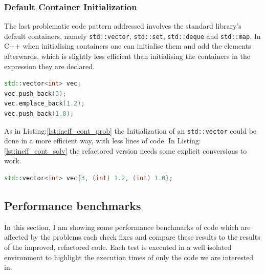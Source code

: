 \subsubsection{Default Container Initialization}
\par The last problematic code pattern addressed involves the standard library's default containers, namely \verb|std::vector|, \verb|std::set|, \verb|std::deque| and \verb|std::map|. In C++ when initialising containers one can initialise them and add the elements afterwards, which is slightly less efficient than initialising the containers in the expression they are declared. \medskip
\begin{lstlisting}[language=c++, frame=single ,caption={Inefficient way of creating containers}, label={lst:ineff_cont_prob}]
std::vector<int> vec;
vec.push_back(3);
vec.emplace_back(1.2);
vec.push_back(1.0);
\end{lstlisting}
\par As in Listing:\ref{lst:ineff_cont_prob} the Initialization of an \verb|std::vector| could be done in a more efficient way, with less lines of code. In Listing:\ref{lst:ineff_cont_solv}  the refactored version needs some explicit conversions to work. 
\begin{lstlisting}[language=c++, frame=single ,caption={A faster way of initialising}, label={lst:ineff_cont_solv}]
std::vector<int> vec{3, (int) 1.2, (int) 1.0};
\end{lstlisting}
\subsection{Performance benchmarks}
\par In this section, I am showing some performance benchmarks of code which are affected by the problems each check fixes and compare these results to the results of the improved, refactored code. Each test is executed in a well isolated environment to highlight the execution times of only the code we are interested in. 
